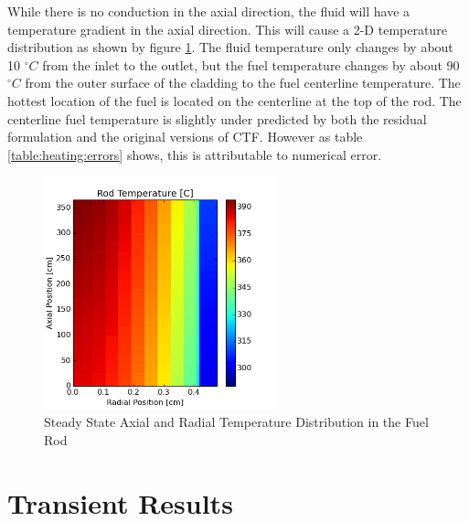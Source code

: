 While there is no conduction in the axial direction, the fluid will have a
temperature gradient in the axial direction. This will cause a 2-D temperature
distribution as shown by figure \ref{fig:Rod_Profile}. The fluid temperature
only changes by about 10 $^{\circ}C$ from the inlet to the outlet, but the fuel
temperature changes by about 90 $^{\circ}C$ from the outer surface of the
cladding to the fuel centerline temperature. The hottest location of the fuel
is located on the centerline at the top of the rod. The centerline fuel
temperature is slightly under predicted by both the residual formulation and
the original versions of CTF. However as table \ref{table:heating:errors}
shows, this is attributable to numerical error.

\begin{figure}[!h]
	\centering
	\includegraphics[width=0.60\textwidth]{images/rod_profile.jpg}
	\caption{Steady State Axial and Radial Temperature Distribution in the Fuel Rod}
	\label{fig:Rod_Profile}
\end{figure}


\section{Transient Results}

